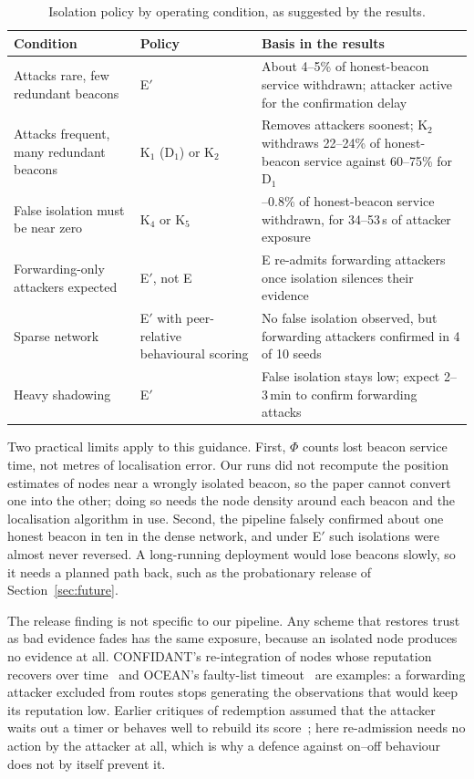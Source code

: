 \begin{table}[!t]
\caption{Isolation policy by operating condition, as suggested by the results.}
\label{tab:guide}
\centering
\small
\begin{tabular}{@{}>{\raggedright\arraybackslash}p{4.4cm}>{\raggedright\arraybackslash}p{2.2cm}>{\raggedright\arraybackslash}p{5.4cm}@{}}
\toprule
Condition & Policy & Basis in the results \\
\midrule
Attacks rare, few redundant beacons & E$'$ & About 4--5\% of honest-beacon service withdrawn; attacker active for the confirmation delay \\
Attacks frequent, many redundant beacons & K$_1$ (D$_1$) or K$_2$ & Removes attackers soonest; K$_2$ withdraws 22--24\% of honest-beacon service against 60--75\% for D$_1$ \\
False isolation must be near zero & K$_4$ or K$_5$ & 0--0.8\% of honest-beacon service withdrawn, for 34--53\,s of attacker exposure \\
Forwarding-only attackers expected & E$'$, not E & E re-admits forwarding attackers once isolation silences their evidence \\
Sparse network & E$'$ with peer-relative behavioural scoring & No false isolation observed, but forwarding attackers confirmed in 4 of 10 seeds \\
Heavy shadowing & E$'$ & False isolation stays low; expect 2--3\,min to confirm forwarding attacks \\
\bottomrule
\end{tabular}
\end{table}

Two practical limits apply to this guidance. First, $\Phi$ counts lost
beacon service time, not metres of localisation error. Our runs did not
recompute the position estimates of nodes near a wrongly isolated beacon, so
the paper cannot convert one into the other; doing so needs the node density
around each beacon and the localisation algorithm in use. Second, the
pipeline falsely confirmed about one honest beacon in ten in the dense
network, and under E$'$ such isolations were almost never reversed. A
long-running deployment would lose beacons slowly, so it needs a planned
path back, such as the probationary release of Section~\ref{sec:future}.

The release finding is not specific to our pipeline. Any scheme that
restores trust as bad evidence fades has the same exposure, because an
isolated node produces no evidence at all. CONFIDANT's re-integration of
nodes whose reputation recovers over time~\cite{buchegger2002confidant} and
OCEAN's faulty-list timeout~\cite{bansal2003ocean} are examples: a forwarding
attacker excluded from routes stops generating the observations that would
keep its reputation low. Earlier critiques of redemption assumed that the
attacker waits out a timer or behaves well to rebuild its
score~\cite{sen2010survey,sun2006attacks}; here re-admission needs no action
by the attacker at all, which is why a defence against on--off behaviour
does not by itself prevent it.


